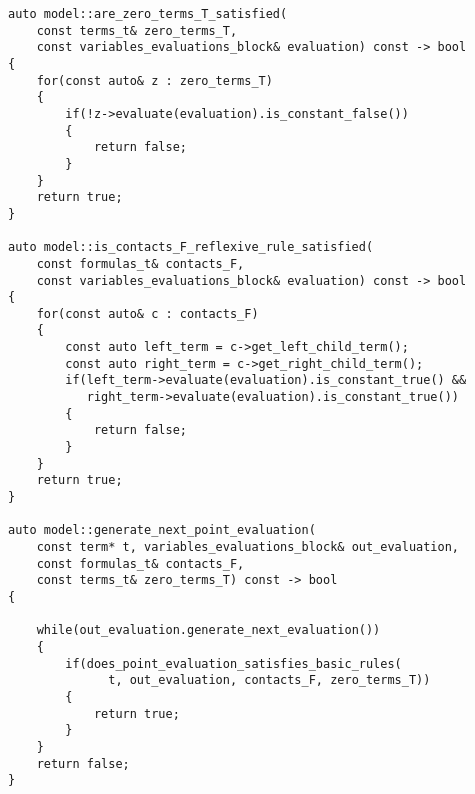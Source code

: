 \documentclass{article}
\begin{document}
\begin{lstlisting}
auto model::are_zero_terms_T_satisfied(
	const terms_t& zero_terms_T,
	const variables_evaluations_block& evaluation) const -> bool
{
    for(const auto& z : zero_terms_T)
    {
        if(!z->evaluate(evaluation).is_constant_false())
        {
            return false;
        }
    }
    return true;
}

auto model::is_contacts_F_reflexive_rule_satisfied(
	const formulas_t& contacts_F,
	const variables_evaluations_block& evaluation) const -> bool
{
    for(const auto& c : contacts_F)
    {
        const auto left_term = c->get_left_child_term();
        const auto right_term = c->get_right_child_term();
        if(left_term->evaluate(evaluation).is_constant_true() &&
           right_term->evaluate(evaluation).is_constant_true())
        {
            return false;
        }
    }
    return true;
}

auto model::generate_next_point_evaluation(
	const term* t, variables_evaluations_block& out_evaluation,
	const formulas_t& contacts_F,
	const terms_t& zero_terms_T) const -> bool
{

    while(out_evaluation.generate_next_evaluation())
    {
        if(does_point_evaluation_satisfies_basic_rules(
              t, out_evaluation, contacts_F, zero_terms_T))
        {
            return true;
        }
    }
    return false;
}
\end{lstlisting}

	\newpage
\end{document}
